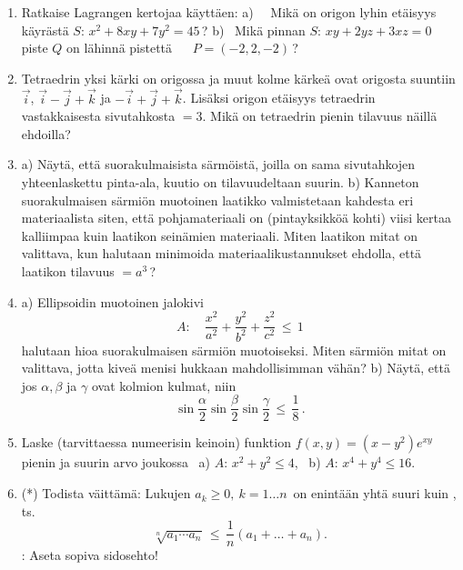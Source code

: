 \begin{enumerate}
\item
Ratkaise Lagrangen kertojaa käyttäen: \vspace{1mm}\newline
a) \ \ Mikä on origon lyhin etäisyys käyrästä $S:\,x^2+8xy+7y^2=45\,$? \newline
b) \   Mikä pinnan $S:\,xy+2yz+3xz=0$ piste $Q$ on lähinnä pistettä 
       $\phantom{\text{b) \ \ }} P=(-2,2,-2)\,$?

\item
Tetraedrin yksi kärki on origossa ja muut kolme kärkeä ovat origosta suuntiin $\vec i$,
$\vec i-\vec j+\vec k$ ja $-\vec i+\vec j+\vec k$. Lisäksi origon etäisyys tetraedrin
vastakkaisesta sivutahkosta $=3$. Mikä on tetraedrin pienin tilavuus näillä ehdoilla?

\item
a) Näytä, että suorakulmaisista särmöistä, joilla on sama sivutahkojen yhteenlaskettu
pinta-ala, kuutio on tilavuudeltaan suurin. \vspace{1mm}\newline
b) Kanneton suorakulmaisen särmiön muotoinen laatikko valmistetaan kahdesta eri materiaalista
siten, että pohjamateriaali on (pintayksikköä kohti) viisi kertaa kalliimpaa kuin laatikon
seinämien materiaali. Miten laatikon mitat on valittava, kun halutaan minimoida 
materiaalikustannukset ehdolla, että laatikon tilavuus $=a^3$\,?

\item
a) Ellipsoidin muotoinen jalokivi
\[
A: \quad \frac{x^2}{a^2}+\frac{y^2}{b^2}+\frac{z^2}{c^2}\,\le\,1
\]
halutaan hioa suorakulmaisen särmiön muotoiseksi. Miten särmiön mitat on valittava, jotta
kiveä menisi hukkaan mahdollisimman vähän? \vspace{1mm}\newline
b) Näytä, että jos $\alpha,\beta$ ja $\gamma$ ovat kolmion kulmat, niin
\[
\sin\frac{\alpha}{2}\sin\frac{\beta}{2}\sin\frac{\gamma}{2}\,\le\,\frac{1}{8}\,.
\]

\item
Laske (tarvittaessa numeerisin keinoin) funktion $f(x,y)=(x-y^2)e^{xy}$ pienin ja suurin
arvo joukossa \ a) $A:\,x^2+y^2 \le 4$, \ b) $A:\,x^4+y^4 \le 16$.

\item (*)  
Todista väittämä: Lukujen $a_k \ge 0,\ k=1 \ldots n\,$  on enintään
yhtä suuri kuin , ts.\ 
\[
\sqrt[n]{a_1 \cdots a_n}\,\le\,\frac{1}{n}(a_1+ \ldots + a_n).
\]
: Aseta sopiva sidosehto!


\end{enumerate}
